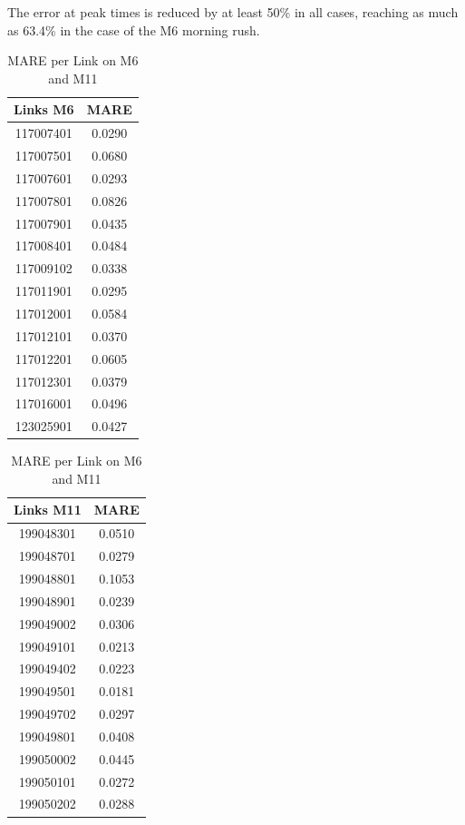 \documentclass[a4paper, 10pt, conference]{ieeeconf}      %
\begin{document}
The error at peak times is reduced by at least 50\% in all cases, reaching as much as 63.4\% in the case of the M6 morning rush.
\begin{table}[htbp]
	\caption{MARE per Link on M6 and M11}
	\begin{center}
		\begin{tabular}{|c|c|}
			\hline
			\textbf{Links M6}&{\textbf{MARE}} \\
			\hline
			117007401& 0.0290\\
			\hline
			117007501& 0.0680\\
			\hline
			117007601& 0.0293\\
			\hline
			117007801& 0.0826\\
			\hline
			117007901& 0.0435\\
			\hline
			117008401& 0.0484\\
			\hline
			117009102& 0.0338\\
			\hline
			117011901& 0.0295\\
			\hline
			117012001& 0.0584\\
			\hline
			117012101& 0.0370\\
			\hline
			117012201& 0.0605\\
			\hline
			117012301& 0.0379\\
			\hline
			117016001& 0.0496\\
			\hline
			123025901& 0.0427\\
			\hline
		\end{tabular}
		\quad
		\begin{tabular}{|c|c|}
			\hline
			\textbf{Links M11}&{\textbf{MARE}} \\
			\hline
			199048301& 0.0510\\
			\hline
			199048701& 0.0279\\
			\hline
			199048801& 0.1053\\
			\hline
			199048901& 0.0239\\
			\hline
			199049002& 0.0306\\
			\hline
			199049101& 0.0213\\
			\hline
			199049402& 0.0223\\
			\hline
			199049501& 0.0181\\
			\hline
			199049702& 0.0297\\
			\hline
			199049801& 0.0408\\
			\hline
			199050002& 0.0445\\
			\hline
			199050101& 0.0272\\
			\hline
			199050202& 0.0288\\

\end{tabular}
\end{center}
\end{table}
\end{document}
